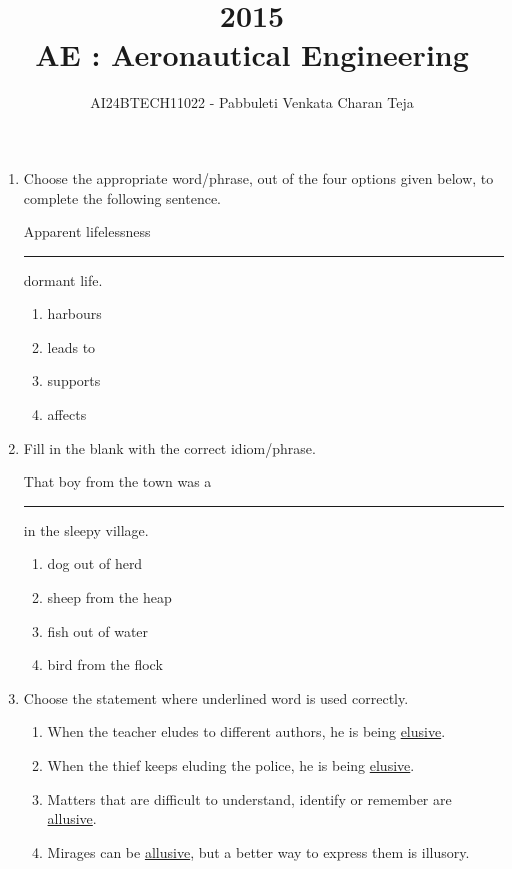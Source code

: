 \documentclass[journal]{IEEEtran}
\begin{document}

\vspace{3cm}

\title{2015\\AE : Aeronautical Engineering}
\author{AI24BTECH11022 - Pabbuleti Venkata Charan Teja}
\maketitle

\renewcommand{\thefigure}{\theenumi}
\renewcommand{\thetable}{\theenumi}


\begin{enumerate}
\item Choose the appropriate word/phrase, out of the four options given below, to complete the following sentence.

Apparent lifelessness \rule{1cm}{0.15mm} dormant life.
\begin{multicols}{2}
\begin{enumerate}
\item harbours
\item leads to
\item supports
\item affects
\end{enumerate}
\end{multicols}


\item Fill in the blank with the correct idiom/phrase.

That boy from the town was a \rule{1cm}{0.15mm} in the sleepy village.
\begin{multicols}{2}
\begin{enumerate}
\item dog out of herd
\item sheep from the heap
\item fish out of water
\item bird from the flock
\end{enumerate}
\end{multicols}


\item Choose the statement where underlined word is used correctly.
\begin{enumerate}
\item When the teacher eludes to different authors, he is being \underline{elusive}.
\item When the thief keeps eluding the police, he is being \underline{elusive}.
\item Matters that are difficult to understand, identify or remember are \underline{allusive}.
\item Mirages can be \underline{allusive}, but a better way to express them is illusory.
\end{enumerate}



\end{enumerate}
\end{document}
